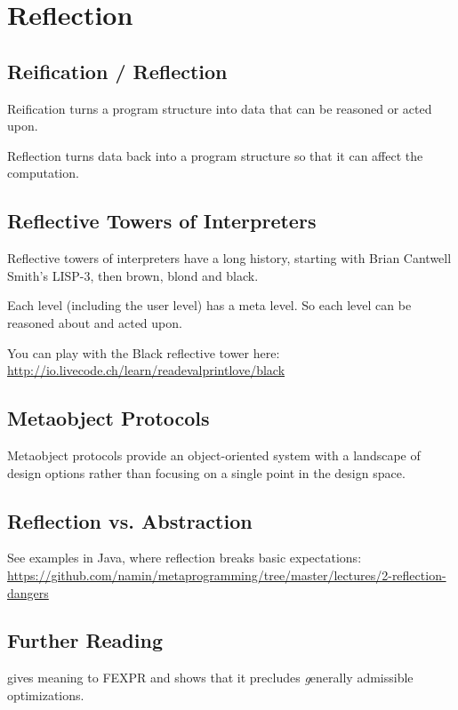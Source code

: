 \chapter{Reflection}

\section{Reification / Reflection}

Reification turns a program structure into data that can be reasoned
or acted upon.

Reflection turns data back into a program structure so that it can
affect the computation.

\section{Reflective Towers of Interpreters}

Reflective towers of interpreters have a long history, starting with
Brian Cantwell Smith's LISP-3, then brown, blond and black.

Each level (including the user level) has a meta level. So each level
can be reasoned about and acted upon.

You can play with the Black reflective tower here:
\url{http://io.livecode.ch/learn/readevalprintlove/black}

\section{Metaobject Protocols}

Metaobject protocols provide an object-oriented system with a
landscape of design options rather than focusing on a single point in
the design space.

\section{Reflection vs. Abstraction}

See examples in Java, where reflection breaks basic expectations: \url{https://github.com/namin/metaprogramming/tree/master/lectures/2-reflection-dangers}

\section{Further Reading}

\cite{Wand1998} gives meaning to FEXPR and shows that it precludes
{\emph generally} admissible optimizations.

